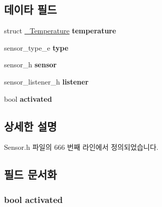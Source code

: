 \subsection*{데이타 필드}
\begin{DoxyCompactItemize}
\item 
\hypertarget{struct__TemperatureExtend_ae174a42339036c716d64258eab61d521}{struct \hyperlink{struct__Temperature}{\-\_\-\-Temperature} {\bfseries temperature}}\label{struct__TemperatureExtend_ae174a42339036c716d64258eab61d521}

\item 
\hypertarget{struct__TemperatureExtend_abffb09766da2fc510a79bb51f82a36e1}{sensor\-\_\-type\-\_\-e {\bfseries type}}\label{struct__TemperatureExtend_abffb09766da2fc510a79bb51f82a36e1}

\item 
\hypertarget{struct__TemperatureExtend_a5bae9b7801bc3808411925cde81d3f26}{sensor\-\_\-h {\bfseries sensor}}\label{struct__TemperatureExtend_a5bae9b7801bc3808411925cde81d3f26}

\item 
\hypertarget{struct__TemperatureExtend_aa977dfb866b24fd7d9a20a9a01b2fd1f}{sensor\-\_\-listener\-\_\-h {\bfseries listener}}\label{struct__TemperatureExtend_aa977dfb866b24fd7d9a20a9a01b2fd1f}

\item 
\hypertarget{struct__TemperatureExtend_a73e9fa0c3543560192f38a8ab6a78c47}{bool {\bfseries activated}}\label{struct__TemperatureExtend_a73e9fa0c3543560192f38a8ab6a78c47}

\end{DoxyCompactItemize}


\subsection{상세한 설명}


Sensor.\-h 파일의 666 번째 라인에서 정의되었습니다.



\subsection{필드 문서화}
\hypertarget{struct__TemperatureExtend_a73e9fa0c3543560192f38a8ab6a78c47}{
\subsubsection[{activated}]{\setlength{\rightskip}{0pt plus 5cm}bool activated}}\label{struct__TemperatureExtend_a73e9fa0c3543560192f38a8ab6a78c47}


